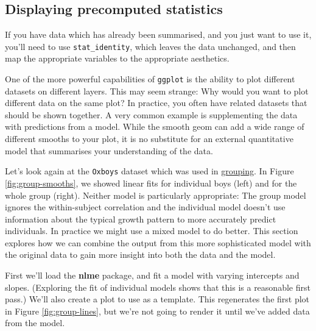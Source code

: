 \subsection{Displaying precomputed statistics}\label{sub:precomputed}

If you have data which has already been summarised, and you just want to
use it, you'll need to use \texttt{stat\_identity}, which leaves the
data unchanged, and then map the appropriate variables to the
appropriate aesthetics.  


One of the more powerful capabilities of \texttt{ggplot} is the ability
to plot different datasets on different layers. This may seem strange:
Why would you want to plot different data on the same plot? In practice,
you often have related datasets that should be shown together. A very
common example is supplementing the data with predictions from a model.
While the smooth geom can add a wide range of different smooths to your
plot, it is no substitute for an external quantitative model that
summarises your understanding of the data.

Let's look again at the \texttt{Oxboys} dataset which was used in
\hyperref[sub:grouping]{grouping}. In Figure \ref{fig:group-smooths}, we
showed linear fits for individual boys (left) and for the whole group
(right). Neither model is particularly appropriate: The group model
ignores the within-subject correlation and the individual model doesn't
use information about the typical growth pattern to more accurately
predict individuals. In practice we might use a mixed model to do
better. This section explores how we can combine the output from this
more sophisticated model with the original data to gain more insight
into both the data and the model. 

First we'll load the \textbf{nlme} package, and fit a model with varying
intercepts and slopes. (Exploring the fit of individual models shows
that this is a reasonable first pass.) We'll also create a plot to use
as a template. This regenerates the first plot in Figure
\ref{fig:group-lines}, but we're not going to render it until we've
added data from the model.

